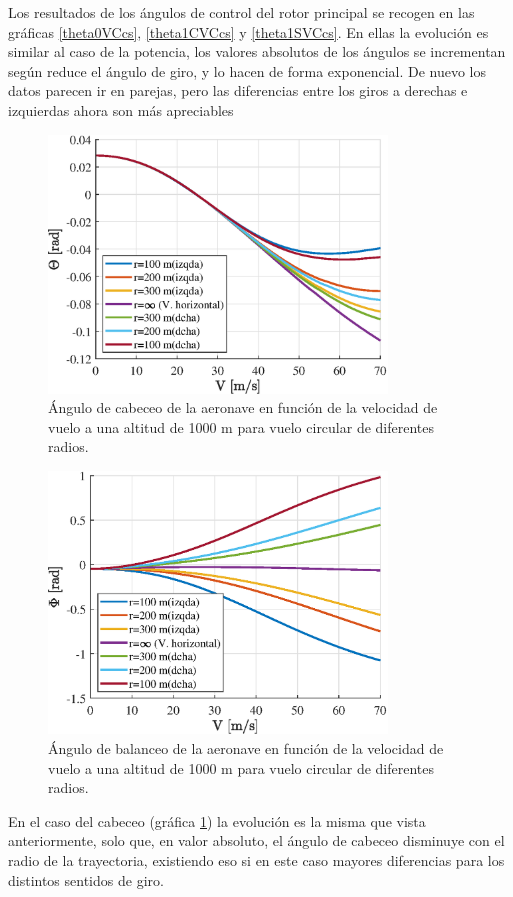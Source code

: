 Los resultados de los ángulos de control del rotor principal se recogen en las gráficas \ref{theta0VCcs}, \ref{theta1CVCcs} y \ref{theta1SVCcs}. En ellas la evolución es similar al caso de la potencia, los valores absolutos de los ángulos se incrementan según reduce el ángulo de giro, y lo hacen de forma exponencial. De nuevo los datos parecen ir en parejas, pero las diferencias entre los giros a derechas e izquierdas ahora son más apreciables

\begin{figure}
	\centering
	\includegraphics[width=90mm]{graficos/CabVCcs}
	\caption{Ángulo de cabeceo de la aeronave en función de la velocidad de vuelo a una altitud de 1000 m para vuelo circular de diferentes radios.}
	\label{CabVCcs}
\end{figure}
\begin{figure}
	\centering
	\includegraphics[width=90mm]{graficos/BalanVCcs}
	\caption{Ángulo de balanceo de la aeronave en función de la velocidad de vuelo a una altitud de 1000 m para vuelo circular de diferentes radios.}
	\label{BalanVCcs}
\end{figure}

En el caso del cabeceo (gráfica \ref{CabVCcs}) la evolución es la misma que vista anteriormente, solo que, en valor absoluto, el ángulo de cabeceo disminuye con el radio de la trayectoria, existiendo eso si en este caso mayores diferencias para los distintos sentidos de giro.

